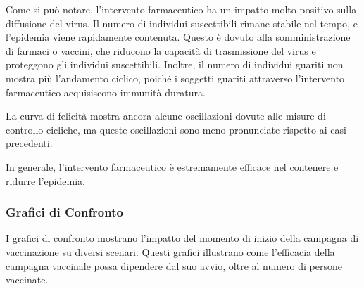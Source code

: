 Come si può notare, l'intervento farmaceutico ha un impatto 
molto positivo sulla diffusione del virus. Il numero di individui 
suscettibili rimane stabile nel tempo, e l'epidemia viene rapidamente 
contenuta. Questo è dovuto alla somministrazione di farmaci o vaccini, 
che riducono la capacità di trasmissione del virus e proteggono gli 
individui suscettibili. Inoltre, il numero di individui guariti non 
mostra più l'andamento ciclico, poiché i soggetti guariti attraverso 
l'intervento farmaceutico acquisiscono immunità duratura.

La curva di felicità mostra ancora alcune oscillazioni dovute alle 
misure di controllo cicliche, ma queste oscillazioni sono meno 
pronunciate rispetto ai casi precedenti.

In generale, l'intervento farmaceutico è estremamente efficace nel 
contenere e ridurre l'epidemia.

\subsubsection{Grafici di Confronto}

I grafici di confronto mostrano l'impatto del momento di inizio della 
campagna di vaccinazione su diversi scenari. Questi grafici illustrano 
come l'efficacia della campagna vaccinale possa dipendere dal suo avvio, 
oltre al numero di persone vaccinate.

